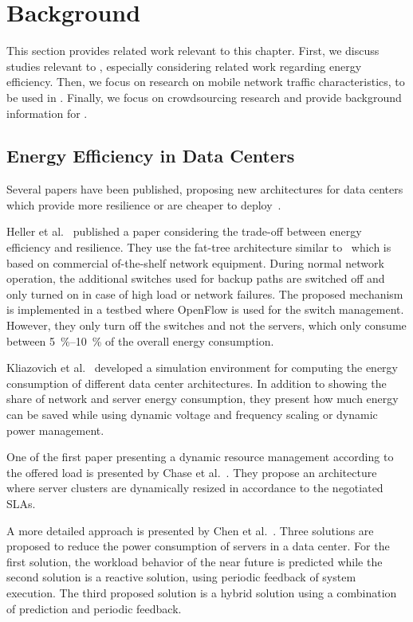 \section{Background}\label{sec:cloud:related_work}
This section provides related work relevant to this chapter.
First, we discuss studies relevant to , especially considering related work regarding energy efficiency.
Then, we focus on research on mobile network traffic characteristics, to be used in .
Finally, we focus on crowdsourcing research and provide background information for .

\subsection{Energy Efficiency in Data Centers}
Several papers have been published, proposing new architectures for data centers which provide more resilience or are cheaper to deploy~\cite{Al-Fares2008, Greenberg2009, Guo2009}.

Heller et al.~\cite{Heller2010} published a paper considering the trade-off between energy efficiency and resilience.
They use the fat-tree architecture similar to~\cite{Al-Fares2008, Greenberg2009} which is based on commercial of-the-shelf network equipment.
During normal network operation, the additional switches used for backup paths are switched off and only turned on in case of high load or network failures.
The proposed mechanism is implemented in a testbed where OpenFlow is used for the switch management.
However, they only turn off the switches and not the servers, which only consume between \SIrange{5}{10}{\percent} of the overall energy consumption.

Kliazovich et al.~\cite{Kliazovich2010} developed a simulation environment for computing the energy consumption of different data center architectures. In addition to showing the share of network and server energy consumption, they present how much energy can be saved while using dynamic voltage and frequency scaling or dynamic power management.

One of the first paper presenting a dynamic resource management according to the offered load  is presented by Chase et al.~\cite{Chase2001}. They propose an architecture where server clusters are dynamically resized in accordance to the negotiated SLAs.

A more detailed approach is presented by Chen et al.~\cite{Chen2005}. Three solutions are proposed to reduce the power consumption of servers in a data center.
For the first solution, the workload behavior of the near future is predicted while the second solution is a reactive solution, using periodic feedback of system execution.
The third proposed solution is a hybrid solution using a combination of prediction and periodic feedback.

